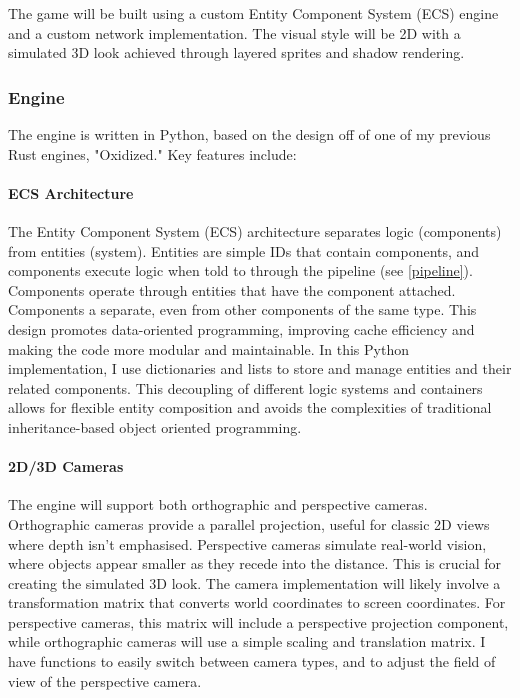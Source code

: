 \documentclass{article}
\begin{document}
The game will be built using a custom Entity Component System (ECS) engine and a custom network implementation. The visual style will be 2D with a simulated 3D look achieved through layered sprites and shadow rendering.

\subsubsection{Engine}

The engine is written in Python, based on the design off of one of my previous Rust engines, "Oxidized." Key features include:

\paragraph{ECS Architecture}

The Entity Component System (ECS) architecture separates logic (components) from entities (system). Entities are simple IDs that contain components, and components execute logic when told to through the pipeline (see \ref{pipeline}). Components operate through entities that have the component attached. Components a separate, even from other components of the same type. This design promotes data-oriented programming, improving cache efficiency and making the code more modular and maintainable. In this Python implementation, I use dictionaries and lists to store and manage entities and their related components. This decoupling of different logic systems and containers allows for flexible entity composition and avoids the complexities of traditional inheritance-based object oriented programming.

\paragraph{2D/3D Cameras}
The engine will support both orthographic and perspective cameras. Orthographic cameras provide a parallel projection, useful for classic 2D views where depth isn't emphasised. Perspective cameras simulate real-world vision, where objects appear smaller as they recede into the distance. This is crucial for creating the simulated 3D look. The camera implementation will likely involve a transformation matrix that converts world coordinates to screen coordinates. For perspective cameras, this matrix will include a perspective projection component, while orthographic cameras will use a simple scaling and translation matrix. I have functions to easily switch between camera types, and to adjust the field of view of the perspective camera.
\end{document}
